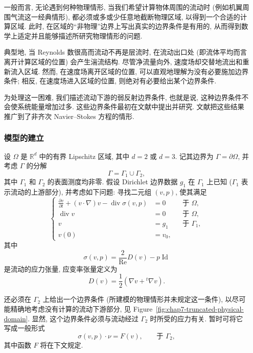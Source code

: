 \begin{sloppypar}
一般而言, 无论遇到何种物理情形, 当我们希望计算物体周围的流动时 (例如机翼周围气流这一经典情形), 都必须或多或少任意地截断物理区域, 以得到一个合适的计算区域. 此时, 在区域的``非物理''边界上写出真实的边界条件是有用的, 从而得到数学上适定并且能够描述所研究物理情形的问题.

典型地, 当 Reynolds 数很高而流动不再是层流时, 在流动出口处 (即流体平均而言离开计算区域的位置) 会产生湍流结构. 尽管净流量向外, 速度场却交替地流出和重新流入区域. 然而, 在速度场离开区域的位置, 可以直观地理解为没有必要施加边界条件; 相反, 在速度场进入区域的位置, 则绝对有必要给出某个边界条件.

为处理这一困难, 我们描述流动下游的弱反射边界条件, 也就是说, 这种边界条件不会使系统能量增加过多. 这些边界条件最初在文献中提出并研究. 文献把这些结果推广到了非齐次 Navier--Stokes 方程的情形.

\subsubsection{模型的建立}
\label{subsec:chap7-outflow-model}

设 $\Omega$ 是 $\mathbb R^d$ 中的有界 Lipschitz 区域, 其中 $d=2$ 或 $d=3$. 记其边界为 $\Gamma=\partial\Omega$, 并考虑 $\Gamma$ 的分解
\[
 \Gamma=\Gamma_1\cup\Gamma_2,
\]
其中 $\Gamma_1$ 和 $\Gamma_2$ 的表面测度均非零. 假设 Dirichlet 边界数据 $g_1$ 在 $\Gamma_1$ 上已知 ($\Gamma_1$ 表示流动的上游部分), 并考虑如下问题: 寻找二元组 $(v,p)$, 使其满足
\begin{equation}
\left\{
\begin{aligned}
 \frac{\partial v}{\partial t}+(v\cdot\nabla)v-\operatorname{div}\sigma(v,p)&=0&&\text{于 }\Omega,\\
 \operatorname{div}v&=0&&\text{于 }\Omega,\\
 v&=g_1&&\text{于 }\Gamma_1,\\
 v(0)&=v_0,
\end{aligned}
\right.
\label{eq:chap7-outflow-navier-stokes-problem}
\end{equation}
其中
\[
 \sigma(v,p)=\frac2{\operatorname{Re}}D(v)-p\operatorname{Id}
\]
是流动的应力张量, 应变率张量定义为
\[
 D(v)=\frac12(\nabla v+{}^t\nabla v).
\]

还必须在 $\Gamma_2$ 上给出一个边界条件 (所建模的物理情形并未规定这一条件), 以尽可能精确地考虑没有计算的流动下游部分, 见 Figure~\ref{fig:chap7-truncated-physical-domain}. 显然, 这个边界条件必须与流动经过 $\Gamma_2$ 时所受的应力有关. 暂时可将它写成一般形式
\begin{equation}
 \sigma(v,p)\cdot\nu=F(v),
 \qquad\text{于 }\Gamma_2,
\label{eq:chap7-general-outflow-condition}
\end{equation}
其中函数 $F$ 将在下文规定.


\end{sloppypar}
